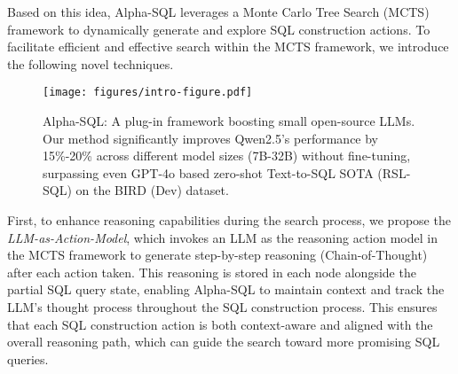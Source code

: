 Based on this idea, Alpha-SQL leverages a Monte Carlo Tree Search (MCTS) framework to dynamically generate and explore SQL construction actions. To facilitate efficient and effective search within the MCTS framework, we introduce the following novel techniques.

\begin{figure}[t!]
    \centering
    \texttt{[image: figures/intro-figure.pdf]}
    \vspace{-2em}
    \caption{Alpha-SQL: A plug-in framework boosting small open-source LLMs. Our method significantly improves Qwen2.5's performance by 15\%-20\% across different model sizes (7B-32B) without fine-tuning, surpassing even GPT-4o based zero-shot Text-to-SQL SOTA (RSL-SQL) on the BIRD (Dev) dataset.}
    \label{fig:plugin}
    \vspace{-.5em}
\end{figure}

%

First, to enhance reasoning capabilities during the search process, we propose the \textit{LLM-as-Action-Model}, which invokes an LLM as the reasoning action model in the MCTS framework to generate step-by-step reasoning (\ie Chain-of-Thought) after each action taken. 
This reasoning is stored in each node alongside the partial SQL query state, enabling Alpha-SQL to maintain context and track the LLM's thought process throughout the SQL construction process.
This ensures that each SQL construction action is both context-aware and aligned with the overall reasoning path, which can guide the search toward more promising SQL queries.

